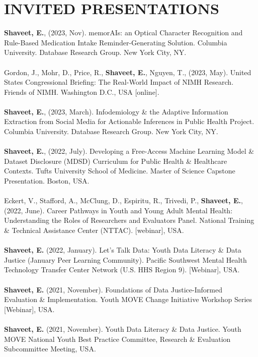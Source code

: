 \documentclass[a4paper,12pt]{article}
\begin{document}
{\section*{INVITED PRESENTATIONS}
\textbf{Shaveet, E.}, (2023, Nov). memorAIs: an Optical Character Recognition and Rule-Based Medication Intake Reminder-Generating Solution. Columbia University. Database Research Group. New York City, NY.\\
\\
Gordon, J., Mohr, D., Price, R., \textbf{Shaveet, E.}, Nguyen, T., (2023, May). United States Congressional Briefing: The Real-World Impact of NIMH Research. Friends of NIMH. Washington D.C., USA [online].\\
\\
\textbf{Shaveet, E.}, (2023, March). Infodemiology \& the Adaptive Information Extraction from Social Media for Actionable Inferences in Public Health Project. Columbia University. Database Research Group. New York City, NY.\\
\\
\textbf{Shaveet, E.}, (2022, July). Developing a Free-Access Machine Learning Model \& Dataset Disclosure (MDSD) Curriculum for Public Health \& Healthcare Contexts. Tufts University School of Medicine. Master of Science Capstone Presentation. Boston, USA.\\
\\
Eckert, V., Stafford, A., McClung, D., Espiritu, R., Trivedi, P., \textbf{Shaveet, E.}, (2022, June). Career Pathways in Youth and Young Adult Mental Health: Understanding the Roles of Researchers and Evaluators Panel. National Training \& Technical Assistance Center (NTTAC). [webinar], USA.\\
\\
\textbf{Shaveet, E.} (2022, January). Let’s Talk Data: Youth Data Literacy \& Data Justice (January Peer Learning Community). Pacific Southwest Mental Health Technology Transfer Center Network (U.S. HHS Region 9). [Webinar], USA.\\
\\
\textbf{Shaveet, E.} (2021, November). Foundations of Data Justice-Informed Evaluation \& Implementation. Youth MOVE Change Initiative Workshop Series [Webinar], USA.\\
\\
\textbf{Shaveet, E.} (2021, November). Youth Data Literacy \& Data Justice. Youth MOVE National Youth Best Practice Committee, Research \& Evaluation Subcommittee Meeting, USA.\\
\\
}
\end{document}

